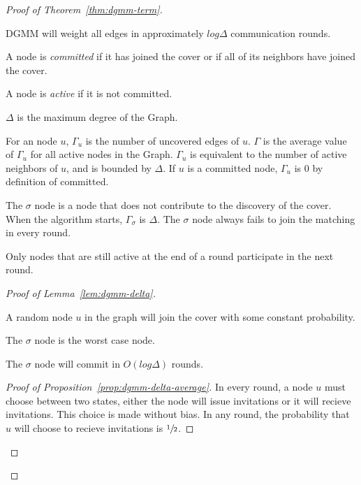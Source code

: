 \begin{proof}[Proof of Theorem~\ref{thm:dgmm-term}]
\begin{lem}
  \label{lem:dgmm-delta}
  DGMM will weight all edges in approximately $log\Delta$ communication rounds.
\end{lem}

\begin{ldef}
A node is {\em committed} if it has joined the cover or if all of its neighbors have joined the cover.
\end{ldef}
\begin{ldef}
A node is {\em active} if it is not committed.
\end{ldef}
\begin{ldef}
$\Delta$ is the maximum degree of the Graph.
\end{ldef}
\begin{ldef}
\label{def:gamma}
For an node $u$, $\Gamma_u$ is the number of uncovered edges of $u$. $\Gamma$ is the average value of $\Gamma_u$ for all active nodes in the Graph. $\Gamma_u$ is equivalent to the number of active neighbors of $u$, and is bounded by $\Delta$. If $u$ is a committed node, $\Gamma_u$ is 0 by definition of committed.
\end{ldef}
\begin{ldef}
\label{def:omega}
The $\sigma$ node is a node that does not contribute to the discovery of the cover. When the algorithm starts, $\Gamma_\sigma$ is $\Delta$. The $\sigma$ node always fails to join the matching in every round.
\end{ldef}
\begin{note}
Only nodes that are still active at the end of a round participate in the next round. 
\end{note}
 
\begin{proof}[Proof of Lemma~\ref{lem:dgmm-delta}]
\begin{lprp}
\label{prop:dgmm-delta-average}
A random node $u$ in the graph will join the cover with some constant probability.
\end{lprp}
\begin{lprp}
\label{prop:dgmm-delta-sigma}
The $\sigma$ node is the worst case node.
\end{lprp}
\begin{lprp}
\label{prop:dgmm-delta-finish}
The $\sigma$ node will commit in $O(log \Delta)$ rounds.
\end{lprp}
\begin{proof}[Proof of Proposition~\ref{prop:dgmm-delta-average}]
In every round, a node $u$ must choose between two states, either the node will issue invitations or it will recieve invitations. This choice is made without bias. In any round, the probability that $u$ will choose to recieve invitations is $\sfrac{1}{2}$.


\end{proof}
\end{proof}
\end{proof}
